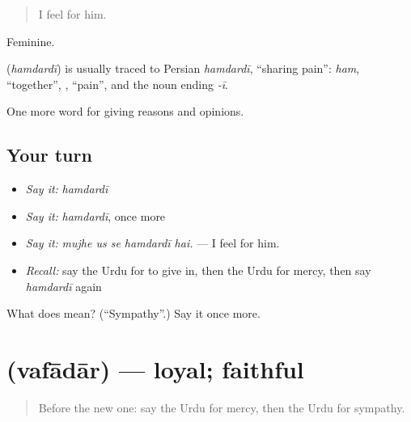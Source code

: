 \begin{quote}
I feel for him.
\end{quote}

Feminine.

\begin{cousinweb}
\textbf{} (\emph{hamdardī}) is usually traced to Persian \emph{hamdardī}, \textquotedblleft{}sharing pain\textquotedblright{}: \emph{ham}, \textquotedblleft{}together\textquotedblright{}, \textbf{}, \textquotedblleft{}pain\textquotedblright{}, and the noun ending \emph{-ī}.
\end{cousinweb}

\begin{grammarlens}[title={What you've built}]
One more word for giving reasons and opinions.
\end{grammarlens}

\subsection*{Your turn}
\begin{itemize}
\raggedright
  \item \emph{Say it:} \emph{hamdardī}
  \item \emph{Say it:} \emph{hamdardī}, once more
  \item \emph{Say it:} \emph{mujhe us se hamdardī hai.} — I feel for him.
  \item \emph{Recall:} say the Urdu for to give in, then the Urdu for mercy, then say \emph{hamdardī} again
\end{itemize}

\begin{tcolorbox}[breakable,colback=teal!4,colframe=teal!35!black,title={Before you move on}]
What does  mean? (\textquotedblleft{}Sympathy\textquotedblright{}.) Say it once more.
\end{tcolorbox}
\section[\texorpdfstring{\ur{وفادار} (vafādār)}{وفادار (vafādār)}]{ (vafādār) — loyal; faithful}

\label{lesson:UR-C360-vafadar}



\begin{quote}
Before the new one: say the Urdu for mercy, then the Urdu for sympathy.
\end{quote}

